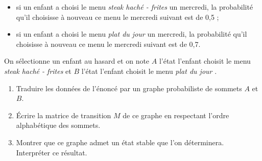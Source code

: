 \begin{itemize}
     \item
     si un enfant a choisi le menu \textit{steak haché - frites} un mercredi, la probabilité qu'il choisisse à nouveau ce menu le mercredi suivant est de 0,5 ;
     \item
     si un enfant a choisi le menu \textit{plat du jour} un mercredi, la probabilité qu'il choisisse à nouveau ce menu le mercredi suivant est de 0,7.
\end{itemize}
\par
On sélectionne un enfant au hasard et on note $A$ l'état \og l'enfant choisit le menu \textit{steak haché - frites} \fg{} et $B$ l'état \og l'enfant choisit le menu \textit{plat du jour} \fg{}.
\par
\begin{enumerate}
     \item Traduire les données de l'énoncé par un graphe probabiliste de sommets $A$ et $B$.
     \item Écrire la matrice de transition $M$ de ce graphe en respectant l'ordre alphabétique des sommets.
     \item Montrer que ce graphe admet un état stable que l'on déterminera.\\
     Interpréter ce résultat.
\end{enumerate}
